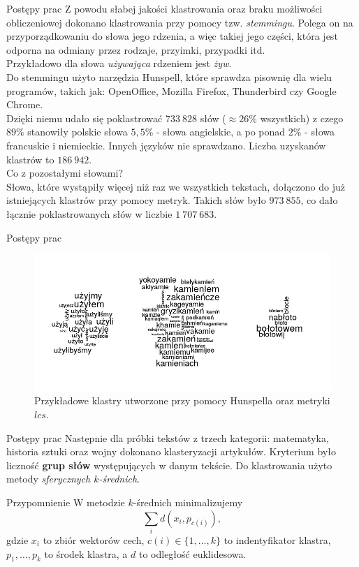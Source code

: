 \documentclass[11pt,pdftex,mathserif]{beamer}\usepackage[]{graphicx}\usepackage[]{color}
\theoremstyle{definition}
\begin{document}
\begin{frame}{Postępy prac}
Z powodu słabej jakości klastrowania oraz braku możliwości obliczeniowej dokonano klastrowania przy pomocy tzw. \emph{stemmingu}. Polega on na przyporządkowaniu do słowa jego rdzenia, a więc takiej jego części, która jest odporna na odmiany przez rodzaje, przyimki, przypadki itd.\\
Przykładowo dla słowa \emph{używająca} rdzeniem jest \emph{żyw}.\\
\pause
Do stemmingu użyto narzędzia Hunspell, które sprawdza pisownię dla wielu programów, takich jak:  OpenOffice, Mozilla Firefox, Thunderbird czy Google Chrome.\\
Dzięki niemu udało się poklastrować $733\ 828$ słów ($\approx 26\%$ wszystkich) z czego $89\%$ stanowiły polskie słowa $5,5\%$ - słowa angielskie, a po ponad $2\%$ - słowa francuskie i niemieckie. Innych języków nie sprawdzano. Liczba uzyskanów klastrów to $186\ 942$.\\
\pause
Co z pozostałymi słowami?\\
Słowa, które wystąpiły więcej niż raz we wszystkich tekstach, dołączono do już istniejących klastrów przy pomocy metryk. Takich słów było $973\ 855$, co dało łącznie poklastrowanych słów w liczbie $1\ 707\ 683$.
\end{frame}


\begin{frame}{Postępy prac}
\begin{figure}[h]
      \centering
      \includegraphics[width=12cm] {clust_all2}
      \caption{Przykładowe klastry utworzone przy pomocy Hunspella oraz metryki $lcs$.}
    \end{figure}
\end{frame}


\begin{frame}{Postępy prac}
Następnie dla próbki tekstów z trzech kategorii: matematyka, historia sztuki oraz wojny dokonano klasteryzacji artykułów. Kryterium było liczność \textbf{grup słów} występujących w danym tekście. Do klastrowania użyto metody \emph{sferycznych $k$-średnich}.\\
\pause
\begin{block}{Przypomnienie}
W metodzie $k$-średnich minimalizujemy
$$
\sum_i d(x_i, p_{c(i)}),
$$
gdzie $x_i$ to zbiór wektorów cech, $c(i) \in \{1,\ldots,k\}$ to indentyfikator klastra, $p_1,\ldots,p_k$ to środek klastra, a $d$ to odległość euklidesowa.
\end{block}
\end{frame}
\end{document}
